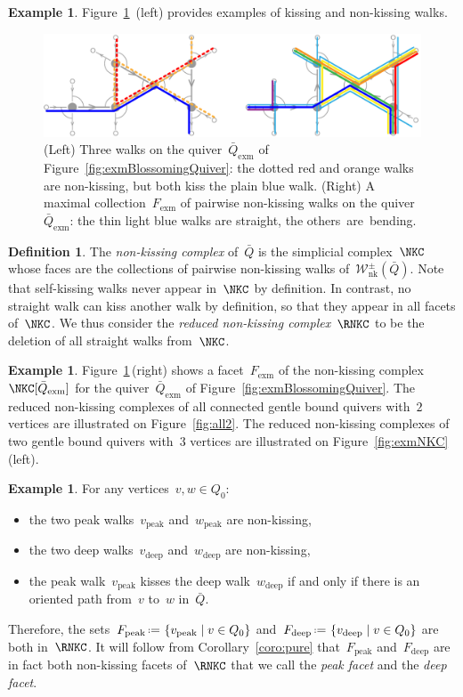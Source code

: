 \documentclass{amsart}
\theoremstyle{definition}
\newtheorem{definition}[theorem]{Definition}
\newtheorem{example}[theorem]{Example}
\newcommand{\set}[2]{\left\{ #1 \;\middle|\; #2 \right\}} %
\newcommand{\eqdef}{\mbox{\,\raisebox{0.2ex}{\scriptsize\ensuremath{\mathrm:}}\ensuremath{=}\,}} %
\newcommand{\fref}[1]{Figure~\ref{#1}} %
\newcommand{\darkblue}{\color{darkblue}} %
\newcommand{\defn}[1]{\textsl{\darkblue #1}} %
\newcommand{\ex}{_{\textrm{exm}}} %
\newcommand{\NKWalks}{\mathcal{W}_\mathrm{nk}} %
\newcommand{\peak}{\mathrm{peak}} %
\newcommand{\deep}{\mathrm{deep}} %
\begin{document}
\begin{example}
\fref{fig:exmFacet}~(left) provides examples of kissing and non-kissing walks.
%
\begin{figure}[t]
	\capstart
	\centerline{\includegraphics[scale=.7]{exmFacet}}
	\caption{(Left) Three walks on the quiver~$\bar Q\ex$ of \fref{fig:exmBlossomingQuiver}: the dotted red and orange walks are non-kissing, but both kiss the plain blue walk. (Right) A maximal collection~$F\ex$ of pairwise non-kissing walks on the quiver~$\bar Q\ex$: the thin light blue walks are straight, the others~are~bending.}
	\label{fig:exmFacet}
\end{figure}
\end{example}

\begin{definition}\label{def: nKc}
The \defn{non-kissing complex} of~$\bar Q$ is the simplicial complex~$\NKC$ whose faces are the collections of pairwise non-kissing walks of~$\NKWalks^\pm(\bar Q)$.
Note that self-kissing walks never appear in~$\NKC$ by definition.
In contrast, no straight walk can kiss another walk by definition, so that they appear in all facets of~$\NKC$.
We thus consider the \defn{reduced non-kissing complex}~$\RNKC$ to be the deletion of all straight walks from~$\NKC$.
\end{definition}

\begin{example}
\fref{fig:exmFacet}\,(right) shows a facet~$F\ex$ of the non-kissing complex~$\NKC[\bar Q\ex]$ for the quiver~$\bar Q\ex$ of \fref{fig:exmBlossomingQuiver}.
The reduced non-kissing complexes of all connected gentle bound quivers with~$2$ vertices are illustrated on \fref{fig:all2}.
The reduced non-kissing complexes of two gentle bound quivers with~$3$ vertices are illustrated on \fref{fig:exmNKC}\,(left).
\end{example}

\begin{example}\label{example: Fdeep Fpeak}
For any vertices~$v,w \in Q_0$:
\begin{itemize}
\item the two peak walks~$v_\peak$ and~$w_\peak$ are non-kissing,
\item the two deep walks~$v_\deep$ and~$w_\deep$ are non-kissing,
\item the peak walk~$v_\peak$ kisses the deep walk~$w_\deep$ if and only if there is an oriented path from~$v$ to~$w$ in~$\bar Q$.
\end{itemize}
Therefore, the sets~$F_\peak \eqdef \set{v_\peak}{v \in Q_0}$ and~$F_\deep \eqdef \set{v_\deep}{v \in Q_0}$ are both in~$\RNKC$.
It will follow from Corollary~\ref{coro:pure} that~$F_\peak$ and~$F_\deep$ are in fact both non-kissing facets of~$\RNKC$ that we call the \defn{peak facet} and the \defn{deep facet}.
\end{example}
\end{document}
